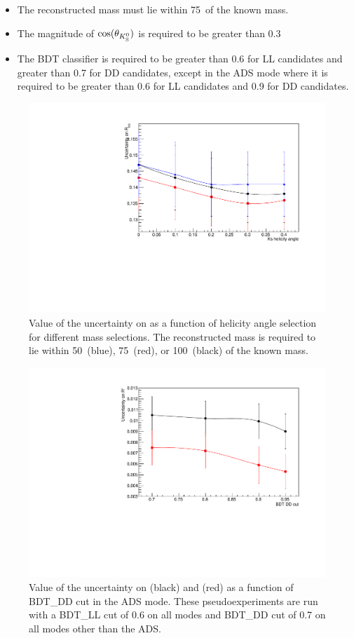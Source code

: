 \begin{itemize}
\item{The reconstructed \Kstarm mass must lie within 75~\mevcc of the known \Kstarm mass.}
\item{The magnitude of $\cos(\theta_{{{K}^0_{\mathrm{ \scriptscriptstyle S}}}})$ is required to be greater than 0.3}
\item{The BDT classifier is required to be greater than 0.6 for LL candidates and greater than 0.7 for DD candidates, except in the ADS mode where it is required to be greater than 0.6 for LL candidates and 0.9 for DD candidates.}
\end{itemize}

\begin{figure}
\centering
\includegraphics[width=0.8\linewidth]{figures/selection/optimisation.pdf}
\caption{Value of the uncertainty on \Rkk as a function of \KS helicity angle selection for different \Kstar mass selections. The reconstructed \Kstarm mass is required to lie within 50~\mevcc (blue), 75~\mevcc (red), or 100~\mevcc (black) of the known \Kstar mass.}
\label{optimisation}
\end{figure}

\begin{figure}
\centering
\includegraphics[width=0.8\linewidth]{figures/selection/ADSoptimisation.pdf}
\caption{Value of the uncertainty on \Rptwo (black) and \Rmtwo (red) as a function of BDT\_DD cut in the ADS mode. These pseudoexperiments are run with a BDT\_LL cut of 0.6 on all modes and BDT\_DD cut of 0.7 on all modes other than the ADS.}
\label{adsoptimisation}
\end{figure}

